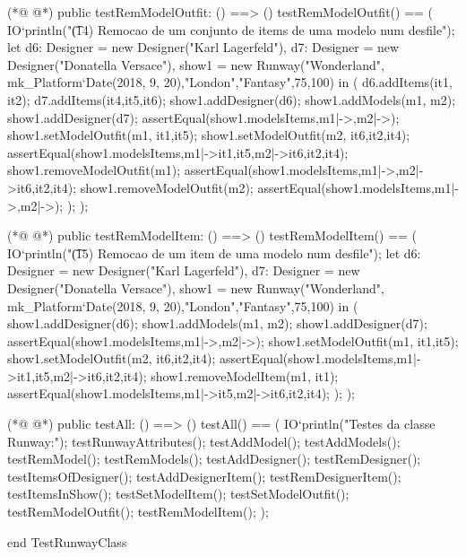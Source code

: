 \begin{vdmpp}[breaklines=true]
 
(*@
\label{testRemModelOutfit:243}
@*)
 public testRemModelOutfit: () ==> ()
 testRemModelOutfit() == (
  IO`println("\t (14) Remocao de um conjunto de items de uma modelo num desfile");
  let d6: Designer = new Designer("Karl Lagerfeld"),
    d7: Designer = new Designer("Donatella Versace"),
  show1 = new Runway("Wonderland", mk_Platform`Date(2018, 9, 20),"London","Fantasy",75,100) in (
    d6.addItems({it1, it2});
    d7.addItems({it4,it5,it6});
    show1.addDesigner(d6);
    show1.addModels({m1, m2});
    show1.addDesigner(d7);
    assertEqual(show1.modelsItems,{m1|->{},m2|->{}});
    show1.setModelOutfit(m1, {it1,it5});
    show1.setModelOutfit(m2, {it6,it2,it4});
    assertEqual(show1.modelsItems,{m1|->{it1,it5},m2|->{it6,it2,it4}});
    show1.removeModelOutfit(m1);
  assertEqual(show1.modelsItems,{m1|->{},m2|->{it6,it2,it4}});
  show1.removeModelOutfit(m2);
  assertEqual(show1.modelsItems,{m1|->{},m2|->{}});    
  );
 );
 
(*@
\label{testRemModelItem:265}
@*)
 public testRemModelItem: () ==> ()
 testRemModelItem() == (
  IO`println("\t (15) Remocao de um item de uma modelo num desfile");
  let d6: Designer = new Designer("Karl Lagerfeld"),
    d7: Designer = new Designer("Donatella Versace"),
  show1 = new Runway("Wonderland", mk_Platform`Date(2018, 9, 20),"London","Fantasy",75,100) in (
    show1.addDesigner(d6);
    show1.addModels({m1, m2});
    show1.addDesigner(d7);
    assertEqual(show1.modelsItems,{m1|->{},m2|->{}});
    show1.setModelOutfit(m1, {it1,it5});
    show1.setModelOutfit(m2, {it6,it2,it4});
    assertEqual(show1.modelsItems,{m1|->{it1,it5},m2|->{it6,it2,it4}});
  show1.removeModelItem(m1, it1);
  assertEqual(show1.modelsItems,{m1|->{it5},m2|->{it6,it2,it4}});
  );
 );
 
(*@
\label{testAll:283}
@*)
 public testAll: () ==> ()
 testAll() == (
 IO`println("Testes da classe Runway:");
  testRunwayAttributes();
  testAddModel();
  testAddModels();
  testRemModel();
  testRemModels();
  testAddDesigner();
  testRemDesigner();
  testItemsOfDesigner();
  testAddDesignerItem();
  testRemDesignerItem();
  testItemsInShow();
  testSetModelItem();
  testSetModelOutfit();
  testRemModelOutfit();
  testRemModelItem();
 );

end TestRunwayClass
\end{vdmpp}
